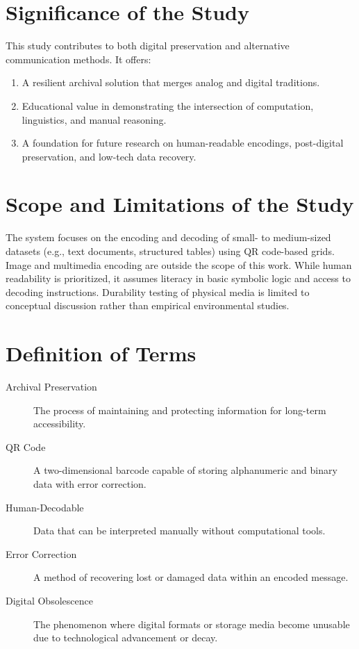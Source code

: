 \documentclass[../main]{subfiles}
\begin{document}
\section{Significance of the Study}

This study contributes to both digital preservation and alternative communication methods. It offers:

\begin{enumerate}
\item A resilient archival solution that merges analog and digital traditions.
\item Educational value in demonstrating the intersection of computation, linguistics, and manual reasoning.
\item A foundation for future research on human-readable encodings, post-digital preservation, and low-tech data recovery.
\end{enumerate}

\section{Scope and Limitations of the Study}
The system focuses on the encoding and decoding of small- to medium-sized datasets (e.g., text documents, structured tables) using QR code-based grids. Image and multimedia encoding are outside the scope of this work. While human readability is prioritized, it assumes literacy in basic symbolic logic and access to decoding instructions. Durability testing of physical media is limited to conceptual discussion rather than empirical environmental studies.

\section{Definition of Terms}
\begin{description}
\item[Archival Preservation] The process of maintaining and protecting information for long-term accessibility.
\item[QR Code] A two-dimensional barcode capable of storing alphanumeric and binary data with error correction.
\item[Human-Decodable] Data that can be interpreted manually without computational tools.
\item[Error Correction] A method of recovering lost or damaged data within an encoded message.
\item[Digital Obsolescence] The phenomenon where digital formats or storage media become unusable due to technological advancement or decay.
\end{description}
\end{document}

